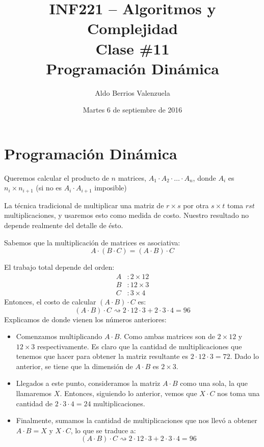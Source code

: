 \documentclass[english, spanish, fleqn, 10pt]{article}
\author{Aldo Berrios Valenzuela}
\title{INF221 -- Algoritmos y Complejidad\\[.4\baselineskip]Clase \#11\\Programación Dinámica}
\date{Martes 6 de septiembre de 2016}
\numberwithin{equation}{section}
\newcommand{\nparentesis}[1]{\left( #1 \right)}
\theoremstyle{definition}
\begin{document}
\maketitle
\section{Programación Dinámica}
Queremos calcular el producto de $n$ matrices, $A_1\cdot A_2\cdot \ldots \cdot A_n$, donde $A_i$ es $n_i\times n_{i+1}$ (si no es $A_i\cdot A_{i+1}$ imposible)

La técnica tradicional de multiplicar una matriz de $r\times s$ por otra $s\times t$ toma $rst$ multiplicaciones, y usaremos esto como medida de costo. Nuestro resultado no depende realmente del detalle de ésto.

Sabemos que la multiplicación de matrices es asociativa:
\begin{equation*}
A\cdot \nparentesis{B\cdot C} = \nparentesis{A\cdot B}\cdot C
\end{equation*}

El trabajo total depende del orden:
\begin{align*}
	A&:2\times 12\\
	B&:12\times 3\\
	C&:3\times 4
\end{align*}
Entonces, el costo de calcular $\nparentesis{A\cdot B}\cdot C$ es:
\begin{equation*}
\nparentesis{A\cdot B}\cdot C\rightsquigarrow 2\cdot 12\cdot 3+2\cdot 3\cdot 4=96
\end{equation*}
Explicamos de donde vienen los números anteriores:
\begin{itemize}
	\item Comenzamos multiplicando $A\cdot B$. Como ambas matrices son de $2\times 12$ y $12\times 3$ respectivamente. Es claro que la cantidad de multiplicaciones que tenemos que hacer para obtener la matriz resultante es $2\cdot 12\cdot 3=72$. Dado lo anterior, se tiene  que la dimensión de $A\cdot B$ es $2\times 3$.
	
	\item Llegados a este punto, consideramos la matriz $A\cdot B$ como una sola, la que llamaremos $X$. Entonces, siguiendo lo anterior, vemos que $X\cdot C$ nos toma una cantidad de $2\cdot 3\cdot 4=24$ multiplicaciones.
	
	\item Finalmente, sumamos la cantidad de multiplicaciones que nos llevó a obtener $A\cdot B=X$ y $X\cdot C$, lo que se traduce a:
	\begin{equation}
	\nparentesis{A\cdot B}\cdot C\rightsquigarrow 2\cdot 12\cdot 3+2\cdot 3\cdot 4=96
	\end{equation}
\end{itemize}
\end{document}
